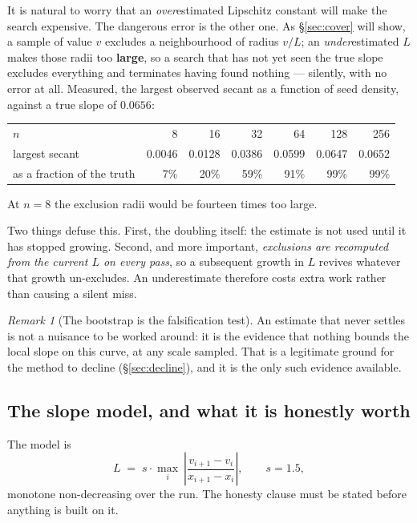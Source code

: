 \documentclass[11pt]{article}
\theoremstyle{definition}
\theoremstyle{remark}
\newtheorem{remark}{Remark}
\newcommand{\abs}[1]{\left\lvert #1 \right\rvert}
\begin{document}
It is natural to worry that an \emph{over}estimated Lipschitz constant will make the search
expensive. The dangerous error is the other one. As \S\ref{sec:cover} will show, a sample of
value $v$ excludes a neighbourhood of radius $v/L$; an \emph{under}estimated $L$ makes those
radii too \textbf{large}, so a search that has not yet seen the true slope excludes everything
and terminates having found nothing --- silently, with no error at all. Measured, the largest
observed secant as a function of seed density, against a true slope of $0.0656$:
\begin{center}
\begin{tabular}{lrrrrrr}
\toprule
$n$ & 8 & 16 & 32 & 64 & 128 & 256\\
largest secant & 0.0046 & 0.0128 & 0.0386 & 0.0599 & 0.0647 & 0.0652 \\
as a fraction of the truth & 7\% & 20\% & 59\% & 91\% & 99\% & 99\% \\
\bottomrule
\end{tabular}
\end{center}
At $n=8$ the exclusion radii would be fourteen times too large.

Two things defuse this. First, the doubling itself: the estimate is not used until it has
stopped growing. Second, and more important, \emph{exclusions are recomputed from the current
$L$ on every pass}, so a subsequent growth in $L$ revives whatever that growth un-excludes. An
underestimate therefore costs extra work rather than causing a silent miss.

\begin{remark}[The bootstrap is the falsification test]
An estimate that never settles is not a nuisance to be worked around: it is the evidence that
nothing bounds the local slope on this curve, at any scale sampled. That is a legitimate ground
for the method to decline (\S\ref{sec:decline}), and it is the only such evidence available.
\end{remark}

\subsection{The slope model, and what it is honestly worth}
\label{sec:slope}

The model is
\begin{equation}\label{eq:L}
  L \;=\; s\cdot\max_{i}\ \abs{\frac{v_{i+1}-v_i}{x_{i+1}-x_i}}, \qquad s = 1.5,
\end{equation}
monotone non-decreasing over the run. The honesty clause must be stated before anything is
built on it.
\end{document}
